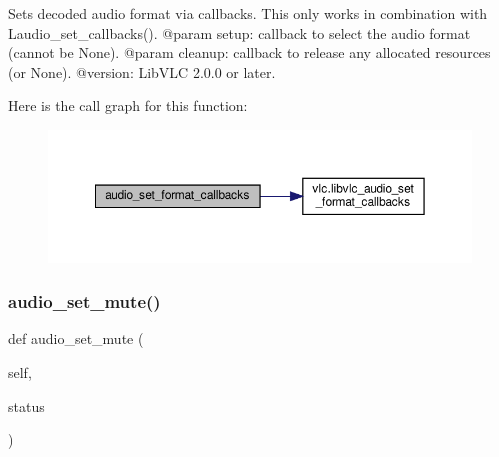 \begin{DoxyVerb}Sets decoded audio format via callbacks.
This only works in combination with L{audio_set_callbacks}().
@param setup: callback to select the audio format (cannot be None).
@param cleanup: callback to release any allocated resources (or None).
@version: LibVLC 2.0.0 or later.
\end{DoxyVerb}
 Here is the call graph for this function\+:
\nopagebreak
\begin{figure}[H]
\begin{center}
\leavevmode
\includegraphics[width=350pt]{classvlc_1_1_media_player_abe86fe67c8a476ce81fa2cdc67182843_cgraph}
\end{center}
\end{figure}
\mbox{\label{classvlc_1_1_media_player_a0eb67e5d4feba97af9ed0e7b2514a9a2}} 
\subsubsection{\texorpdfstring{audio\+\_\+set\+\_\+mute()}{audio\_set\_mute()}}
{\footnotesize\ttfamily def audio\+\_\+set\+\_\+mute (\begin{DoxyParamCaption}\item[{}]{self,  }\item[{}]{status }\end{DoxyParamCaption})}

